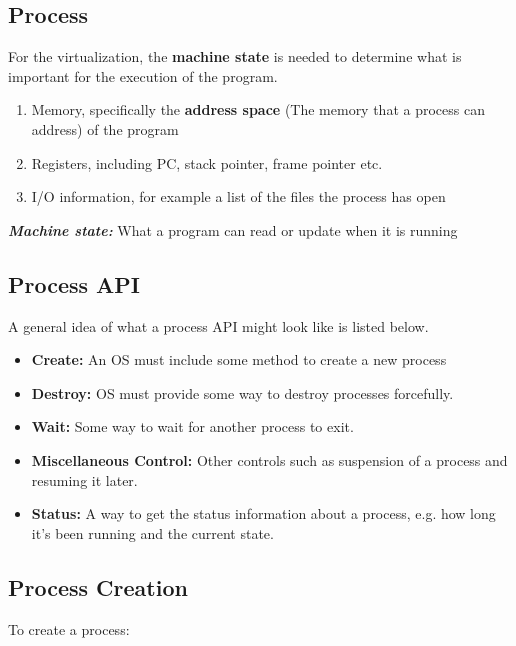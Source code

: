 \documentclass[12pt]{article}
\begin{document}
\subsection{Process}
For the virtualization, the \textbf{machine state} is needed to determine what is important for the execution of the program. 
\begin{enumerate}
    \item Memory, specifically the \textbf{address space} (The memory that a process can address) of the program 
    \item Registers, including PC, stack pointer, frame pointer etc.
    \item I/O information, for example a list of the files the process has open 
\end{enumerate}

\begin{definitionbox}[title= Definition]
  \textbf{\textit{Machine state:}} What a program can read or update when it is running
\end{definitionbox}

\subsection{Process API}
A general idea of what a process API might look like is listed below.

\begin{itemize}
  \item \textbf{Create:} An OS must include some method to create a new process
  \item \textbf{Destroy:} OS must provide some way to destroy processes forcefully.
  \item \textbf{Wait:} Some way to wait for another process to exit.
  \item \textbf{Miscellaneous Control:}  Other controls such as suspension of a process and resuming it later.
  \item \textbf{Status:} A way to get the status information about a process, e.g. how long it's been running and the current state.
\end{itemize}

\subsection{Process Creation}
To create a process:
\end{document}

